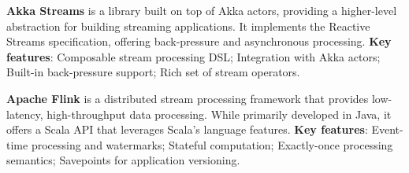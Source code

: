 \textbf{Akka Streams} is a library built on top of Akka actors, providing a higher-level abstraction for building streaming applications. It implements the Reactive Streams specification, offering back-pressure and asynchronous processing. \textbf{Key features}: Composable stream processing DSL; Integration with Akka actors; Built-in back-pressure support; Rich set of stream operators.

\textbf{Apache Flink} is a distributed stream processing framework that provides low-latency, high-throughput data processing. While primarily developed in Java, it offers a Scala API that leverages Scala's language features. \textbf{Key features}: Event-time processing and watermarks; Stateful computation; Exactly-once processing semantics; Savepoints for application versioning.